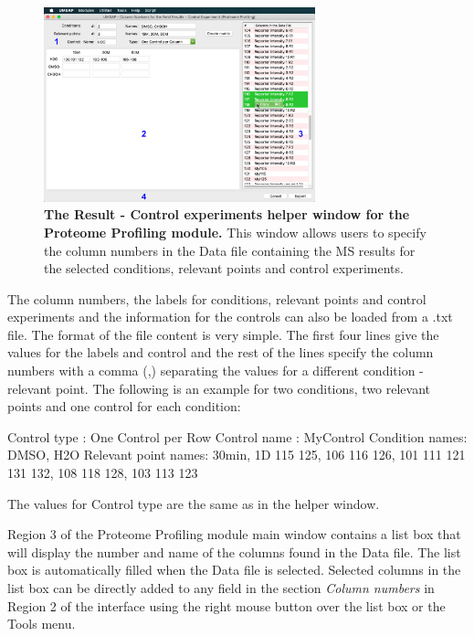 \begin{figure}[h]
	\centering
	\includegraphics[width=0.7\textwidth]{./IMAGES/MOD-PROTPROF/protprof-rescontrol.jpg}
	\caption[The Result - Control experiments helper window for the Proteome Profiling module]{\textbf{The Result - Control experiments helper window for the Proteome Profiling module.} This window allows users to specify the column numbers in the Data file containing the MS results for the selected conditions, relevant points and control experiments.} 
	\label{fig:protprofResControlWindow}
	\vspace{-5pt} 	
\end{figure}

The column numbers, the labels for conditions, relevant points and control experiments and the information for the controls can also be loaded from a .txt file. The format of the file content is very simple. The first four lines give the values for the labels and control and the rest of the lines specify the column numbers with a comma (,) separating the values for a different condition - relevant point. The following is an example for two conditions, two relevant points and one control for each condition:

Control type : One Control per Row\newline
Control name : MyControl\newline
Condition names: DMSO, H2O\newline
Relevant point names: 30min, 1D\newline
{} 115 125, 106 116 126, 101 111 121   131 132, 108 118 128, 103 113 123\newline

The values for Control type are the same as in the helper window.

Region \num{3} of the Proteome Profiling module main window contains a list box that will display the number and name of the columns found in the Data file. The list box is automatically filled when the Data file is selected. Selected columns in the list box can be directly added to any field in the section \textit{Column numbers} in Region \num{2} of the interface using the right mouse button over the list box or the Tools menu.

